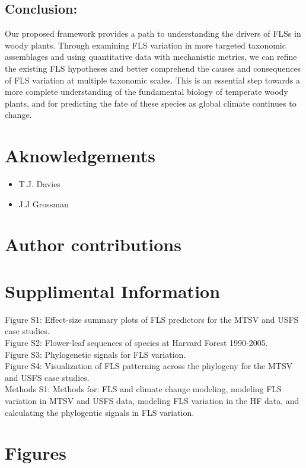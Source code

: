 \documentclass[12pt]{article}
\begin{document}
\subsection*{Conclusion:} 
\noindent Our proposed framework provides a path to understanding the drivers of FLSs in woody plants. Through examining FLS variation in more targeted taxonomic assemblages and using quantitative data with mechanistic metrics, we can refine the existing FLS hypotheses and better comprehend the causes and consequences of FLS variation at multiple taxonomic scales. This is an essential step towards a more complete understanding of the fundamental biology of temperate woody plants, and for predicting the fate of these species as global climate continues to change.

\section*{Aknowledgements}
\begin{itemize}
\item T.J. Davies
\item J.J Grossman
\end{itemize}

\section*{Author contributions}



\newpage
\section*{Supplimental Information}
Figure S1: Effect-size summary plots of FLS predictors for the MTSV and USFS case studies. \\
Figure S2: Flower-leaf sequences of species at Harvard Forest 1990-2005.\\
Figure S3: Phylogenetic signals for FLS variation.\\
Figure S4: Visualization of FLS patterning across the phylogeny for the MTSV and USFS case studies.\\
Methods S1: Methods for: FLS and climate change modeling, modeling FLS variation in MTSV and USFS data, modeling FLS variation in the HF data, and calculating the phylogentic signals in FLS variation.
\newpage
\section*{Figures}
\end{document}
